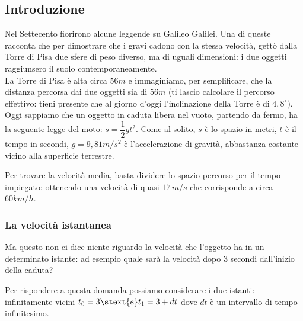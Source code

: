 \subsection{Introduzione}
\label{subsec:differenziazione_introduzione}
Nel Settecento fiorirono alcune leggende su Galileo Galilei. Una di queste 
racconta che per dimostrare che i gravi cadono con la stessa velocità, 
gettò dalla Torre di Pisa due sfere di peso diverso, ma di uguali 
dimensioni: i due oggetti raggiunsero il suolo 
contemporaneamente.\\
La Torre di Pisa è alta circa \(56m\) e immaginiamo, per semplificare, 
che la distanza percorsa dai due oggetti sia di \(56m\) (ti lascio 
calcolare il percorso effettivo: tieni presente che al giorno d'oggi 
l'inclinazione della Torre è di \(4,8^\circ\)).\\
Oggi sappiamo che un oggetto in caduta libera nel vuoto, 
partendo da fermo, ha la seguente legge del moto:
\(s=\dfrac{1}{2}gt^2\). Come al solito, \(s\) è lo spazio in metri, 
\(t\) è il tempo in secondi, \(g=9,81 m/s^2\) è l'accelerazione di 
gravità, abbastanza costante vicino alla superficie terrestre.

Per trovare la velocità media, basta dividere lo spazio percorso per il 
tempo impiegato: ottenendo una velocità di quasi \(17\,m/s\) che 
corrisponde a circa \(60 km/h\). 




\subsubsection{La velocità istantanea}
\label{subsubsec:differenziazione_velocita_istantanea}

Ma questo non ci dice niente riguardo la velocità che l'oggetto ha in un 
determinato istante: ad esempio quale sarà la velocità 
dopo 3 secondi dall'inizio della caduta?

Per rispondere a questa domanda possiamo considerare i due istanti: 
infinitamente vicini \(t_0 = 3 \stext{e} t_1 = 3 + dt\) dove \(dt\) è un 
intervallo di tempo infinitesimo.


